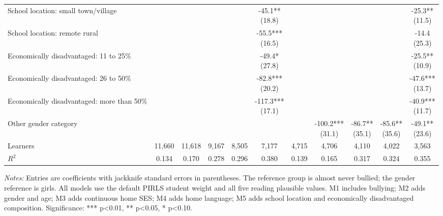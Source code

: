 \begin{table}[!htbp]
{\begin{tabular}{lcccccccccc}
School location: small town/village &  &  &  &  & \shortstack{-45.1**\\(18.8)} &  &  &  &  & \shortstack{-25.3**\\(11.5)} \\
School location: remote rural &  &  &  &  & \shortstack{-55.5***\\(16.5)} &  &  &  &  & \shortstack{-14.4\\(25.3)} \\
Economically disadvantaged: 11 to 25\% &  &  &  &  & \shortstack{-49.4*\\(27.8)} &  &  &  &  & \shortstack{-25.5**\\(10.9)} \\
Economically disadvantaged: 26 to 50\% &  &  &  &  & \shortstack{-82.8***\\(20.2)} &  &  &  &  & \shortstack{-47.6***\\(13.7)} \\
Economically disadvantaged: more than 50\% &  &  &  &  & \shortstack{-117.3***\\(17.1)} &  &  &  &  & \shortstack{-40.9***\\(11.7)} \\
Other gender category &  &  &  &  &  &  & \shortstack{-100.2***\\(31.1)} & \shortstack{-86.7**\\(35.1)} & \shortstack{-85.6**\\(35.6)} & \shortstack{-49.1**\\(23.6)} \\
\midrule
Learners & 11,660 & 11,618 & 9,167 & 8,505 & 7,177 & 4,715 & 4,706 & 4,110 & 4,022 & 3,563 \\
$R^{2}$ & 0.134 & 0.170 & 0.278 & 0.296 & 0.380 & 0.139 & 0.165 & 0.317 & 0.324 & 0.355 \\
\bottomrule
\end{tabular}%
}
\parbox{0.98\textwidth}{\footnotesize \textit{Notes:} Entries are coefficients with jackknife standard errors in parentheses. The reference group is almost never bullied; the gender reference is girls. All models use the default PIRLS student weight and all five reading plausible values. M1 includes bullying; M2 adds gender and age; M3 adds continuous home SES; M4 adds home language; M5 adds school location and economically disadvantaged composition. Significance: *** p\textless{}0.01, ** p\textless{}0.05, * p\textless{}0.10.}
\end{table}
